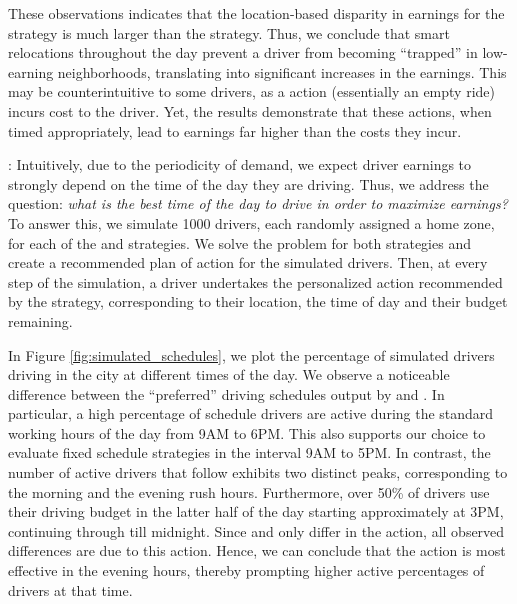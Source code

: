 These observations indicates that the location-based disparity in earnings for the {\naive} strategy is much larger than the {\relocation} strategy. Thus, we conclude that smart relocations throughout the day prevent a driver from becoming ``trapped'' in low-earning neighborhoods, translating 
into significant increases in the earnings. 
This may be counterintuitive to some drivers, as a {\relocate} action (essentially an empty ride) 
incurs cost to the driver. Yet, the results demonstrate that these actions, when timed appropriately, 
lead to earnings far higher than the costs they incur.


: Intuitively, due to the periodicity of demand, we expect driver earnings to strongly depend on the time of the day they are driving. 
Thus, we address the question: \textit{what is the best time of the day to drive in order to maximize earnings?} To answer this, we simulate 1000 drivers, each randomly assigned a home zone, for each of the {\flexible} and {\relocationflexible} strategies. 
We solve the {\originalproblem} problem for both strategies and create a recommended plan of action for the simulated drivers. 
Then, at every step of the simulation, a driver undertakes the personalized action recommended by the strategy, corresponding to
  their location, the time of day and their budget remaining.


In Figure \ref{fig:simulated_schedules}, we plot the percentage of simulated drivers driving in the city at different times of the day. We observe a noticeable difference between the ``preferred'' driving schedules 
output by {\flexible} and {\relocationflexible}.
In particular, a high percentage of {\flexible} schedule drivers are active during the standard working hours of the day from 9AM to 6PM. This also 
supports our choice to evaluate fixed schedule strategies in the interval 9AM to 5PM. In contrast, the number of active
drivers that follow {\relocationflexible} exhibits two distinct peaks, corresponding to the morning and the evening rush hours. Furthermore, over 50\% of {\relocationflexible} drivers use their driving budget in the latter half of the day starting approximately at 3PM, continuing through till midnight. 
Since {\flexible} and {\relocationflexible} only differ in 
the {\relocate} action, all observed differences are due to this action.
Hence, we can  conclude that the {\relocate} action is most effective in the evening hours, thereby prompting higher active percentages of {\relocationflexible} drivers at that time.

